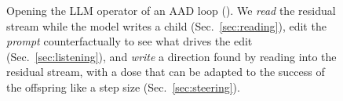 \begin{figure}[t]
  \centering
  
  \caption{Opening the LLM operator of an AAD loop (\llamea). We
    \emph{read} the residual stream while the model writes a child
    (Sec.~\ref{sec:reading}), edit the \emph{prompt} counterfactually to
    see what drives the edit (Sec.~\ref{sec:listening}), and
    \emph{write} a direction found by reading into the residual stream,
    with a dose that can be adapted to the success of the offspring
    like a step size (Sec.~\ref{sec:steering}).}
  \label{fig:overview}
\end{figure}

